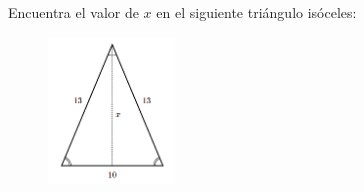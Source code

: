 Encuentra el valor de $x$ en el siguiente triángulo isóceles:
\begin{figure}[H]
    \begin{center}
        \includegraphics[width=0.3\textwidth]{../images/pitagoras7.png}
    \end{center}
    \caption{}
    \label{fig:pitagoras7}
\end{figure}